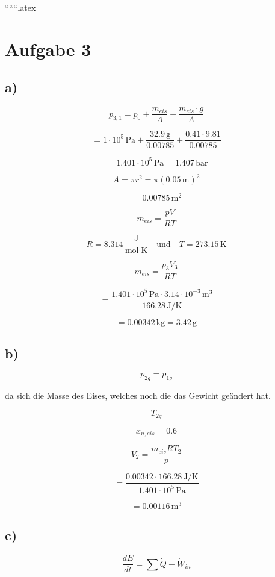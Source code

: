 
``````latex


\section*{Aufgabe 3}

\subsection*{a)}

\[
p_{3,1} = p_0 + \frac{m_{eis}}{A} + \frac{m_{eis} \cdot g}{A}
\]

\[
= 1 \cdot 10^5 \, \text{Pa} + \frac{32.9 \, \text{g}}{0.00785} + \frac{0.41 \cdot 9.81}{0.00785}
\]

\[
= 1.401 \cdot 10^5 \, \text{Pa} = 1.407 \, \text{bar}
\]

\[
A = \pi r^2 = \pi (0.05 \, \text{m})^2
\]

\[
= 0.00785 \, \text{m}^2
\]

\[
m_{eis} = \frac{pV}{RT}
\]

\[
R = 8.314 \, \frac{\text{J}}{\text{mol} \cdot \text{K}} \quad \text{und} \quad T = 273.15 \, \text{K}
\]

\[
m_{eis} = \frac{p_3 V_3}{RT}
\]

\[
= \frac{1.401 \cdot 10^5 \, \text{Pa} \cdot 3.14 \cdot 10^{-3} \, \text{m}^3}{166.28 \, \text{J/K}}
\]

\[
= 0.00342 \, \text{kg} = 3.42 \, \text{g}
\]

\subsection*{b)}

\[
p_{2g} = p_{1g}
\]

da sich die Masse des Eises, welches noch die das Gewicht geändert hat.

\[
T_{2g}
\]

\[
x_{n,eis} = 0.6
\]

\[
V_2 = \frac{m_{eis} RT_2}{p}
\]

\[
= \frac{0.00342 \cdot 166.28 \, \text{J/K}}{1.401 \cdot 10^5 \, \text{Pa}}
\]

\[
= 0.00116 \, \text{m}^3
\]

\subsection*{c)}

\[
\frac{dE}{dt} = \sum \dot{Q} - \dot{W}_{in}
\]


